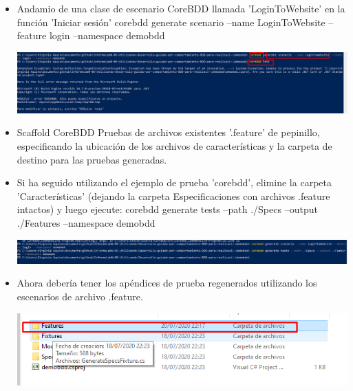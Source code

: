 \begin{itemize}
\item Andamio de una clase de escenario CoreBDD llamada 'LoginToWebsite' en la función 'Iniciar sesión'
corebdd generate scenario --name LoginToWebsite --feature login --namespace demobdd
\begin{center}
\includegraphics[width=\columnwidth]{images/8}\newline
\end{center}
\item Scaffold CoreBDD Pruebas de archivos existentes '.feature' de pepinillo, especificando la ubicación de los
archivos de características y la carpeta de destino para las pruebas generadas.
\item Si ha seguido utilizando el ejemplo de prueba 'corebdd', elimine la carpeta 'Características' (dejando la
carpeta Especificaciones con archivos .feature intactos) y luego ejecute:
corebdd generate tests --path ./Specs --output ./Features --namespace demobdd
\begin{center}
\includegraphics[width=\columnwidth]{images/9}\newline
\end{center}
\item Ahora debería tener los apéndices de prueba regenerados utilizando los escenarios de archivo .feature.
\begin{center}
\includegraphics[width=\columnwidth]{images/10}\newline
\end{center}
\end{itemize}